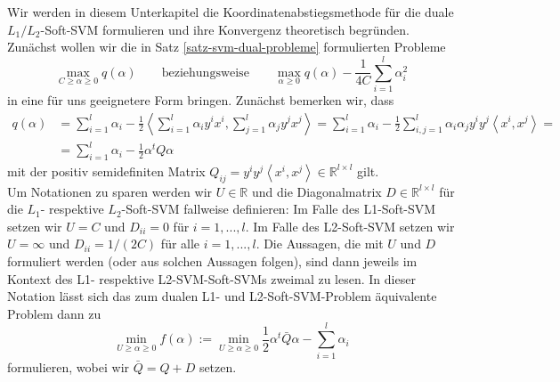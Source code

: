 Wir werden in diesem Unterkapitel die Koordinatenabstiegsmethode für die duale $L_1/L_2$-Soft-SVM formulieren und ihre Konvergenz theoretisch begründen. Zunächst wollen wir die in Satz \ref{satz-svm-dual-probleme} formulierten Probleme 
$$\max_{C \geq \alpha \geq 0} q(\alpha) \qquad
	\text{beziehungsweise} \qquad 
	\max_{\alpha \geq 0} q(\alpha) - \frac{1}{4C}\sum_{i=1}^{l}\alpha_i^2
$$
in eine für uns geeignetere Form bringen. Zunächst bemerken wir, dass 
$$
\begin{aligned}
	q(\alpha) &= \sum_{i=1}^{l} \alpha_i - \frac{1}{2} \left< \sum_{i=1}^{l} \alpha_i y^i x^i ,\sum_{j=1}^{l} \alpha_j y^j x^j \right> =  
	\sum_{i=1}^{l} \alpha_i - \frac{1}{2} \sum_{i,j=1}^{l} \alpha_i \alpha_j y^i y^j \left< x^i, x^j \right> = \\
	&= \sum_{i=1}^{l} \alpha_i - \frac{1}{2} \alpha^t Q \alpha
\end{aligned}
$$
mit der positiv semidefiniten Matrix $Q_{ij} = y^i y^j \left<x^i, x^j \right> \in \mathbb{R}^{l \times l}$ gilt. \\


Um Notationen zu sparen werden wir $U \in \mathbb{R}$ und die Diagonalmatrix $D \in \mathbb{R}^{l \times l}$ für die $L_1$- respektive $L_2$-Soft-SVM fallweise definieren: Im Falle des L1-Soft-SVM setzen wir $U=C$ und $D_{ii} = 0$ für $i=1,...,l$. Im Falle des L2-Soft-SVM setzen wir  $U=\infty$ und $D_{ii} = 1/(2C)$ für alle $i=1,...,l$. Die Aussagen, die mit $U$ und $D$ formuliert werden (oder aus solchen Aussagen folgen), sind dann jeweils im Kontext des L1- respektive L2-SVM-Soft-SVMs zweimal zu lesen. In dieser Notation lässt sich das zum dualen L1- und L2-Soft-SVM-Problem äquivalente Problem dann zu
\begin{equation}\label{equ:op-impl}
	\min_{U \geq \alpha \geq 0} f(\alpha) := \min_{U \geq \alpha \geq 0} \frac{1}{2}\alpha^t \bar{Q} \alpha - \sum_{i=1}^{l} \alpha_i
\end{equation}
formulieren, wobei wir $\bar{Q} = Q+D$ setzen. \\

